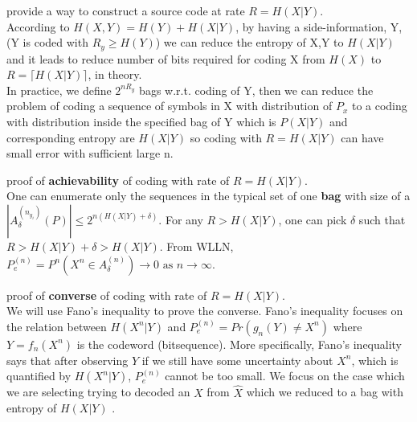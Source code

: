 \documentclass[
  course = {{EE623 Information Theory}},
  quartile = {{4}},
  assignment = 4,
  name = {{Mohammad Mahdi Rahimi}},
  studentnumber = {{20208244}},
  email = {{mahi@kaist.ac.kr}},
  firstexercise = 1
]{aga-homework}
\begin{document}
\exercise
\subexercise provide a way to construct a source code at rate $R = H(X|Y)$.\\

According to $H(X,Y) = H(Y) + H(X|Y)$, by having a side-information, Y, (Y is coded with $R_y \ge H(Y)$) we can reduce the entropy of X,Y to $H(X|Y)$ and it leads to reduce number of bits required for coding X from $H(X)$ to $R = \lceil H(X|Y) \rceil$, in theory.\\

In practice, we define $2^{nR_y}$ bags w.r.t. coding of Y, then we can reduce the problem of coding a sequence of symbols in X with distribution of $P_x$ to a coding with distribution inside the specified bag of Y which is $P(X|Y)$ and corresponding entropy are $H(X|Y)$ so coding with $R = H(X|Y)$ can have small error with sufficient large n.

\subexercise proof of \textbf{achievability} of coding with rate of $R = H(X|Y)$.\\
One can enumerate only the sequences in the typical set of one \textbf{bag} with size of a  $|A^{(n_{y_i})}_\delta (P)| \le 2^{n(H(X|Y) + \delta)}$.  For any $R > H(X|Y)$, one can pick $\delta$ such that $R > H(X|Y)  + \delta > H(X|Y)$. From WLLN, $P^{(n)}_e = P^n(X^n \in A^{(n)}_\delta ) \rightarrow 0\text{ as }n \rightarrow \infty$.


\subexercise proof of \textbf{converse} of coding with rate of $R = H(X|Y)$.\\
We will use Fano’s inequality to prove the converse. Fano’s inequality focuses on the relation between $H(X^n|Y)$ and $P^{(n)}_e = Pr(g_n(Y) \neq X^n)$  where $Y = f_n(X^n)$ is the codeword (bitsequence).  More specifically, Fano’s inequality says that after observing $Y$ if we still have some uncertainty about $X^n$, which is quantified by $H(X^n|Y)$, $P^{(n)}_e$ cannot be too small.
We focus on the case which we are selecting trying to decoded an $X$ from $ \hat{X} $ which we reduced to a bag with entropy of $H(X|Y)$ .\\
\end{document}
